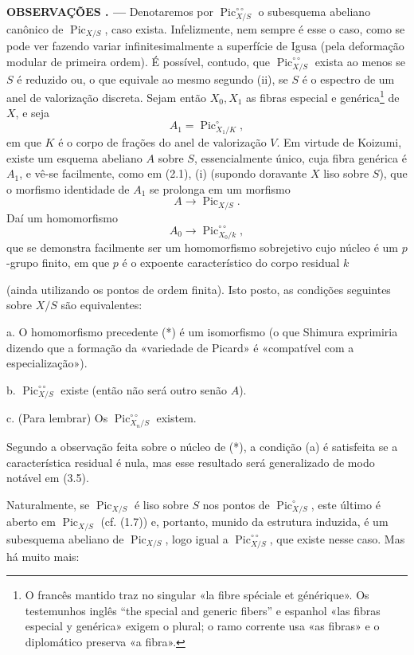 \documentclass[11pt,twoside,openany]{book}
\numberwithin{equation}{section}
\newcommand{\src}[1]{%
  \phantomsection\hypertarget{src:#1}{}%
  \marginpar{\raggedleft\footnotesize\sffamily #1}%
}
\theoremstyle{plain}
\theoremstyle{definition}
\theoremstyle{remark}
\newcommand{\result}[2]{%
  \par\medskip\noindent\textbf{#1%
  \if\relax\detokenize{#2}\relax\else\space#2\fi. ---}\enspace
}
\newcommand{\FgaUnitKey}{frontmatter}
\renewcommand{\src}[1]{%
  \phantomsection\hypertarget{src:\FgaUnitKey:#1}{}%
  \marginpar{\raggedleft\footnotesize\sffamily #1}%
}
\begin{document}
\result{OBSERVAÇÕES}{3.4} Denotaremos por
$\operatorname{Pic}_{X/S}^{\circ\circ}$ o subesquema abeliano canônico de
$\operatorname{Pic}_{X/S}$, caso exista. Infelizmente, nem sempre é esse o
caso, como se pode ver fazendo variar infinitesimalmente a superfície de Igusa
(pela deformação modular de primeira ordem). É possível, contudo, que
$\operatorname{Pic}_{X/S}^{\circ\circ}$ exista ao menos se $S$ é reduzido ou,
o que equivale ao mesmo segundo (ii), se $S$ é o espectro de um anel de
valorização discreta. Sejam então $X_0,X_1$ as fibras especial e
genérica\footnote{O francês mantido traz no singular «la fibre spéciale et
générique». Os testemunhos inglês “the special and generic fibers” e espanhol
«las fibras especial y genérica» exigem o plural; o ramo corrente usa «as
fibras» e o diplomático preserva «a fibra».} de $X$, e seja
\[
A_1=\operatorname{Pic}_{X_1/K}^\circ,
\]
em que $K$ é o corpo de frações do anel de valorização $V$. Em virtude de
Koizumi, existe um esquema abeliano $A$ sobre $S$, essencialmente único, cuja
fibra genérica é $A_1$, e vê-se facilmente, como em (2.1), (i) (supondo
doravante $X$ liso sobre $S$), que o morfismo identidade de $A_1$ se prolonga em um
morfismo
\[
A\longrightarrow\operatorname{Pic}_{X/S}.
\]
Daí um homomorfismo
\[
\tag{*}A_0\longrightarrow\operatorname{Pic}_{X_0/k}^{\circ\circ},
\]
que se demonstra facilmente ser um homomorfismo sobrejetivo cujo núcleo é um
$p$-grupo finito, em que $p$ é o expoente característico do corpo residual $k$
\src{239}
(ainda utilizando os pontos de ordem finita). Isto posto, as condições
seguintes sobre $X/S$ são equivalentes:

\medskip
\noindent a. O homomorfismo precedente (*) é um isomorfismo (o que Shimura
exprimiria dizendo que a formação da «variedade de Picard» é «compatível com a
especialização»).

\noindent b. $\operatorname{Pic}_{X/S}^{\circ\circ}$ existe (então não será
outro senão $A$).

\noindent c. (Para lembrar) Os
$\operatorname{Pic}_{X_n/S}^{\circ\circ}$ existem.

Segundo a observação feita sobre o núcleo de (*), a condição (a) é satisfeita
se a característica residual é nula, mas esse resultado será generalizado de
modo notável em (3.5).

Naturalmente, se $\operatorname{Pic}_{X/S}$ é liso sobre $S$ nos pontos de
$\operatorname{Pic}_{X/S}^\circ$, este último é
aberto em $\operatorname{Pic}_{X/S}$ (cf. (1.7)) e, portanto, munido da
estrutura induzida, é um subesquema abeliano de
$\operatorname{Pic}_{X/S}$, logo igual a
$\operatorname{Pic}_{X/S}^{\circ\circ}$, que existe nesse caso. Mas há muito
mais:
\end{document}
